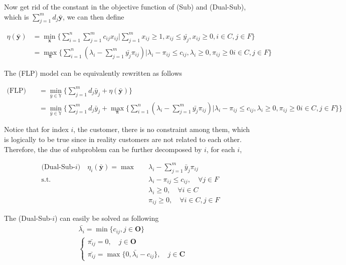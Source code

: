            Now get rid of the constant in the objective function of (Sub) and (Dual-Sub), which is $\sum_{j = 1}^m d_j \bar{\mathbf{y}}$, we can then define

            \begin{align*}
                \eta(\bar{\mathbf{y}}) &= \min_\mathbf{x} \{\sum_{i = 1}^n \sum_{j = 1}^m c_{ij} x_{ij} | \sum_{j = 1}^m x_{ij} \ge 1, x_{ij} \le \bar{y_j}, x_{ij} \ge 0, i \in C, j \in F\}\\
                &= \max_\mathbf{\pi} \{\sum_{i=1}^n (\lambda_i - \sum_{j = 1}^m \bar{y_j} \pi_{ij})|\lambda_i - \pi_{ij} \le c_{ij}, \lambda_i \ge 0, \pi_{ij} \ge 0 i \in C, j \in F\}
            \end{align*}

            The (FLP) model can be equivalently rewritten as follows

            \begin{align*}
                \text{(FLP)} \quad & = \min_{\bar{y} \in \mathbb{Y}}\{\sum_{j = 1}^m d_j \bar{y}_j + \eta(\bar{\mathbf{y}})\}\\
                & = \min_{\bar{y} \in \mathbb{Y}} \{\sum_{j = 1}^m d_j \bar{y}_j + \max_\mathbf{\pi} \{\sum_{i=1}^n (\lambda_i - \sum_{j = 1}^m \bar{y_j} \pi_{ij})|\lambda_i - \pi_{ij} \le c_{ij}, \lambda_i \ge 0, \pi_{ij} \ge 0 i \in C, j \in F\}\}
            \end{align*}

            Notice that for index $i$, the customer, there is no constraint among them, which is logically to be true since in reality customers are not related to each other. Therefore, the due of subproblem can be further decomposed by $i$, for each $i$,

            \begin{align*}
                \text{(Dual-Sub-$i$)} \quad \eta_i(\bar{\mathbf{y}}) = \max \quad & \lambda_i - \sum_{j = 1}^m \bar{y}_j \pi_{ij}\\
                \text{s.t.} \quad & \lambda_i - \pi_{ij} \le c_{ij}, \quad \forall j \in F\\
                & \lambda_i \ge 0, \quad \forall i \in C\\
                & \pi_{ij} \ge 0, \quad \forall i \in C, j \in F
            \end{align*}

            The (Dual-Sub-$i$) can easily be solved as following
            \begin{align*}
                &\bar{\lambda_i} = \min \{c_{ij}, j \in \mathbf{O}\}\\
                &\begin{cases}
                    \bar{\pi_{ij}} = 0, \quad j \in \mathbf{O}\\
                    \bar{\pi_{ij}} = \max \{0, \bar{\lambda_i} - c_{ij}\}, \quad j \in \mathbf{C}
                \end{cases}
            \end{align*}

